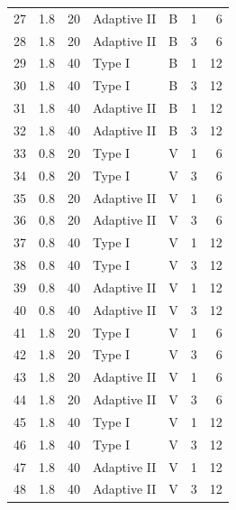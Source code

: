 \begin{longtable}{rrrllrr}
27 & 1.8 & 20 & Adaptive II & B & 1 & 6 \\
28 & 1.8 & 20 & Adaptive II & B & 3 & 6 \\
29 & 1.8 & 40 & Type I & B & 1 & 12 \\
30 & 1.8 & 40 & Type I & B & 3 & 12 \\
31 & 1.8 & 40 & Adaptive II & B & 1 & 12 \\
32 & 1.8 & 40 & Adaptive II & B & 3 & 12 \\
33 & 0.8 & 20 & Type I & V & 1 & 6 \\
34 & 0.8 & 20 & Type I & V & 3 & 6 \\
35 & 0.8 & 20 & Adaptive II & V & 1 & 6 \\
36 & 0.8 & 20 & Adaptive II & V & 3 & 6 \\
37 & 0.8 & 40 & Type I & V & 1 & 12 \\
38 & 0.8 & 40 & Type I & V & 3 & 12 \\
39 & 0.8 & 40 & Adaptive II & V & 1 & 12 \\
40 & 0.8 & 40 & Adaptive II & V & 3 & 12 \\
41 & 1.8 & 20 & Type I & V & 1 & 6 \\
42 & 1.8 & 20 & Type I & V & 3 & 6 \\
43 & 1.8 & 20 & Adaptive II & V & 1 & 6 \\
44 & 1.8 & 20 & Adaptive II & V & 3 & 6 \\
45 & 1.8 & 40 & Type I & V & 1 & 12 \\
46 & 1.8 & 40 & Type I & V & 3 & 12 \\
47 & 1.8 & 40 & Adaptive II & V & 1 & 12 \\
48 & 1.8 & 40 & Adaptive II & V & 3 & 12 \\
\bottomrule
\end{longtable}

